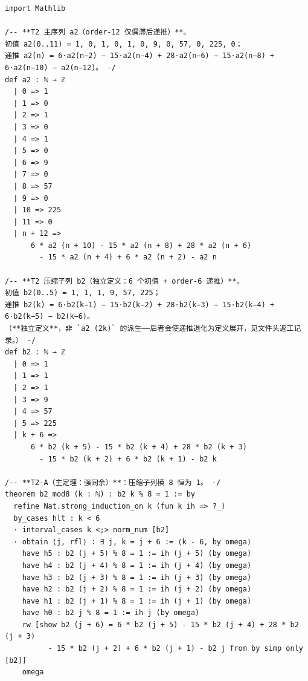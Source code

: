 \documentclass[11pt]{article}
\begin{document}
\begin{lstlisting}[caption={Verbatim excerpt, lines 36--139 of \texttt{final/02-mod3x3-proved.lean} (139 lines, sha256 \texttt{79c19719}...); the full text is in the deposit's \texttt{proofs/}.},label={lst:proof}]
import Mathlib

/-- **T2 主序列 a2（order-12 仅偶滞后递推）**。
初值 a2(0..11) = 1, 0, 1, 0, 1, 0, 9, 0, 57, 0, 225, 0；
递推 a2(n) = 6·a2(n−2) − 15·a2(n−4) + 28·a2(n−6) − 15·a2(n−8) + 6·a2(n−10) − a2(n−12)。 -/
def a2 : ℕ → ℤ
  | 0 => 1
  | 1 => 0
  | 2 => 1
  | 3 => 0
  | 4 => 1
  | 5 => 0
  | 6 => 9
  | 7 => 0
  | 8 => 57
  | 9 => 0
  | 10 => 225
  | 11 => 0
  | n + 12 =>
      6 * a2 (n + 10) - 15 * a2 (n + 8) + 28 * a2 (n + 6)
        - 15 * a2 (n + 4) + 6 * a2 (n + 2) - a2 n

/-- **T2 压缩子列 b2（独立定义：6 个初值 + order-6 递推）**。
初值 b2(0..5) = 1, 1, 1, 9, 57, 225；
递推 b2(k) = 6·b2(k−1) − 15·b2(k−2) + 28·b2(k−3) − 15·b2(k−4) + 6·b2(k−5) − b2(k−6)。
（**独立定义**，非 `a2 (2k)` 的派生——后者会使递推退化为定义展开，见文件头返工记录。） -/
def b2 : ℕ → ℤ
  | 0 => 1
  | 1 => 1
  | 2 => 1
  | 3 => 9
  | 4 => 57
  | 5 => 225
  | k + 6 =>
      6 * b2 (k + 5) - 15 * b2 (k + 4) + 28 * b2 (k + 3)
        - 15 * b2 (k + 2) + 6 * b2 (k + 1) - b2 k

/-- **T2-A（主定理：强同余）**：压缩子列模 8 恒为 1。 -/
theorem b2_mod8 (k : ℕ) : b2 k % 8 = 1 := by
  refine Nat.strong_induction_on k (fun k ih => ?_)
  by_cases hlt : k < 6
  · interval_cases k <;> norm_num [b2]
  · obtain ⟨j, rfl⟩ : ∃ j, k = j + 6 := ⟨k - 6, by omega⟩
    have h5 : b2 (j + 5) % 8 = 1 := ih (j + 5) (by omega)
    have h4 : b2 (j + 4) % 8 = 1 := ih (j + 4) (by omega)
    have h3 : b2 (j + 3) % 8 = 1 := ih (j + 3) (by omega)
    have h2 : b2 (j + 2) % 8 = 1 := ih (j + 2) (by omega)
    have h1 : b2 (j + 1) % 8 = 1 := ih (j + 1) (by omega)
    have h0 : b2 j % 8 = 1 := ih j (by omega)
    rw [show b2 (j + 6) = 6 * b2 (j + 5) - 15 * b2 (j + 4) + 28 * b2 (j + 3)
          - 15 * b2 (j + 2) + 6 * b2 (j + 1) - b2 j from by simp only [b2]]
    omega


\end{lstlisting}
\end{document}
